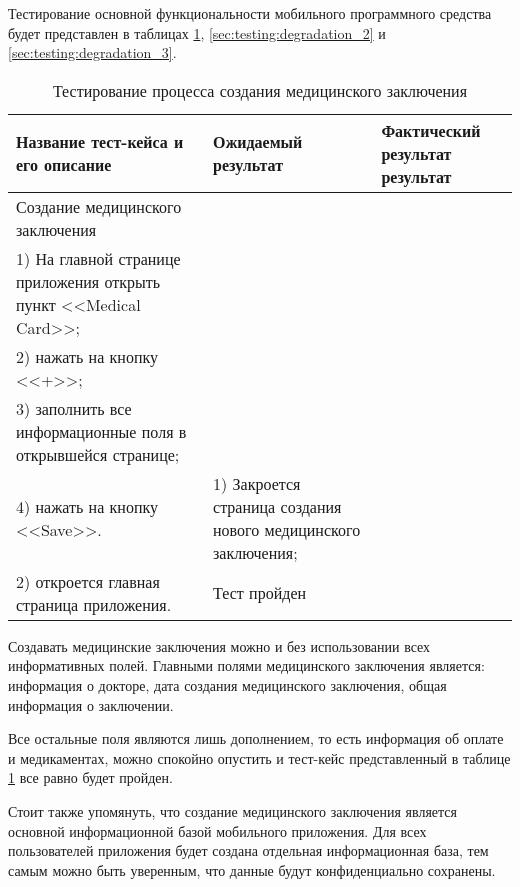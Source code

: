 Тестирование основной функциональности мобильного программного средства будет представлен в таблицах \ref{sec:testing:degradation_1}, \ref{sec:testing:degradation_2}  и \ref{sec:testing:degradation_3}.

\begin{longtable}[p]{| >{\raggedright}p{}                     
                     | >{\raggedright}p{}
                     | >{\raggedright\arraybackslash}p{}|}
  \caption{Тестирование процесса создания медицинского заключения}
  \label{sec:testing:degradation_1} \tabularnewline

  \hline
      Название тест-кейса и его описание & Ожидаемый результат & Фактический результат результат \\
   \hline
   Создание медицинского заключения\\ 
   1) На главной странице приложения открыть пункт <<Medical Card>>; \\
   2) нажать на кнопку <<+>>;\\
   3) заполнить все информационные поля в открывшейся странице;\\
   4) нажать на кнопку <<Save>>.

   &
   1) Закроется страница создания нового медицинского заключения;\\
   2) откроется главная страница приложения.

   &
   Тест пройден \\
   \hline
\end{longtable}

Создавать медицинские заключения можно и без использовании всех информативных полей. Главными полями медицинского заключения является: информация о докторе, дата создания медицинского заключения, общая информация о заключении.

Все остальные поля являются лишь дополнением, то есть информация об оплате и медикаментах, можно спокойно опустить и тест-кейс представленный в таблице \ref{sec:testing:degradation_1} все равно будет пройден.

Стоит также упомянуть, что создание медицинского заключения является основной информационной базой мобильного приложения. Для всех пользователей приложения будет создана отдельная информационная база, тем самым можно быть уверенным, что данные будут конфиденциально сохранены.

\pagebreak

